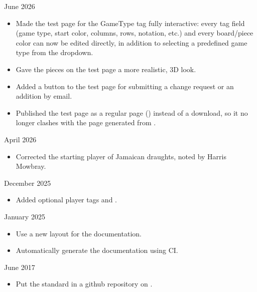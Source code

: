 \documentclass[letterpaper,10pt,english]{sphinxmanual}
\begin{document}
 June 2026
\begin{itemize}
\item {} 
\sphinxAtStartPar
Made the test page for the GameType tag fully interactive: every tag
field (game type, start color, columns, rows, notation, etc.) and every
board/piece color can now be edited directly, in addition to selecting
a predefined game type from the dropdown.

\item {} 
\sphinxAtStartPar
Gave the pieces on the test page a more realistic, 3D look.

\item {} 
\sphinxAtStartPar
Added a button to the test page for submitting a change request or an
addition by email.

\item {} 
\sphinxAtStartPar
Published the test page as a regular page
() instead of a download, so it no
longer clashes with the page generated from .

\end{itemize}

 April 2026
\begin{itemize}
\item {} 
\sphinxAtStartPar
Corrected the starting player of Jamaican draughts, noted by Harris Mowbray.

\end{itemize}

 December 2025
\begin{itemize}
\item {} 
\sphinxAtStartPar
Added optional player tags  and .

\end{itemize}

 January 2025
\begin{itemize}
\item {} 
\sphinxAtStartPar
Use a new layout for the documentation.

\item {} 
\sphinxAtStartPar
Automatically generate the documentation using CI.

\end{itemize}

 June 2017
\begin{itemize}
\item {} 
\sphinxAtStartPar
Put the standard in a github repository on .

\end{itemize}
\end{document}

